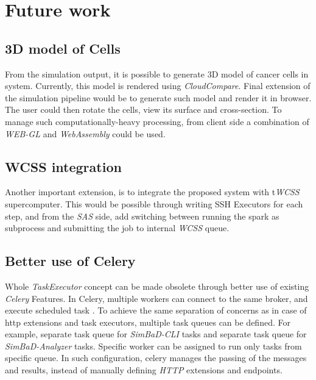 \section{Future work}
\subsection{3D model of Cells}
From the simulation output, it is possible to generate 3D model of cancer cells in system. Currently, this model is rendered using \textit{CloudCompare}. Final extension of the simulation pipeline would be to generate such model and render it in browser. The user could then rotate the cells, view its surface and cross-section. To manage such computationally-heavy processing, from client side a combination of \textit{WEB-GL} and \textit{WebAssembly} could be used.
\subsection{WCSS integration}
Another important extension, is to integrate the proposed system with t\textit{WCSS} supercomputer. This would be possible through writing SSH Executors for each step, and from the \textit{SAS} side, add switching between running the spark as subprocess and submitting the job to internal \textit{WCSS} queue.
\subsection{Better use of Celery}
Whole \textit{TaskExecutor} concept can be made obsolete through better use of existing \textit{Celery} Features. In Celery, multiple workers can connect to the same broker, and execute scheduled task \cite{CeleryRouting}. To achieve the same separation of concerns as in case of http extensions and task executors, multiple task queues can be defined. For example, separate task queue for \textit{SimBaD-CLI} tasks and separate task queue for \textit{SimBaD-Analyzer} tasks. Specific worker can be assigned to run only tasks from specific queue. In such configuration, celery manages the passing of the messages and results, instead of manually defining \textit{HTTP} extensions and endpoints.
